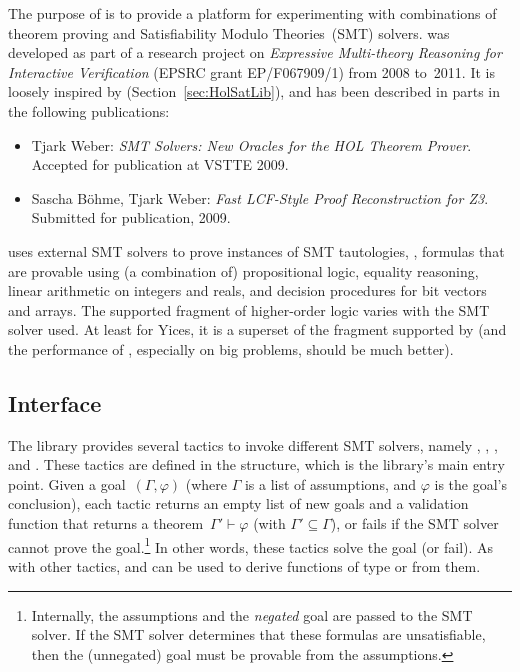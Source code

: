 
\setcounter{sessioncount}{0}

The purpose of  is to provide a platform for
experimenting with combinations of theorem proving and Satisfiability
Modulo Theories~(SMT) solvers.   was developed as part
of a research project on {\it Expressive Multi-theory Reasoning for
  Interactive Verification} (EPSRC grant EP/F067909/1) from 2008
to~2011.  It is loosely inspired by 
(Section~\ref{sec:HolSatLib}), and has been described in parts in the
following publications:
\begin{itemize}
\item Tjark Weber: {\it SMT Solvers: New Oracles for the HOL Theorem
  Prover}.  Accepted for publication at VSTTE 2009.%
\item Sascha B{\"o}hme, Tjark Weber: {\it Fast LCF-Style Proof
  Reconstruction for Z3}. Submitted for publication, 2009.%
\end{itemize}
 uses external SMT solvers to prove instances of SMT
tautologies, \ie, formulas that are provable using (a combination of)
propositional logic, equality reasoning, linear arithmetic on integers
and reals, and decision procedures for bit vectors and arrays.  The
supported fragment of higher-order logic varies with the SMT solver
used.  At least for Yices, it is a superset of the fragment supported
by  (and the performance of ,
especially on big problems, should be much better).

\subsection{Interface}

The library provides several tactics to invoke different SMT solvers,
namely , , , and
.  These tactics are defined in the 
structure, which is the library's main entry point.  Given a
goal~$(\Gamma, \varphi)$ (where $\Gamma$ is a list of assumptions, and
$\varphi$ is the goal's conclusion), each tactic returns an empty list
of new goals and a validation function that returns a theorem~$\Gamma'
\vdash \varphi$ (with $\Gamma' \subseteq \Gamma$), or fails if the SMT
solver cannot prove the goal.\footnote{Internally, the assumptions and
  the \emph{negated} goal are passed to the SMT solver.  If the SMT
  solver determines that these formulas are unsatisfiable, then the
  (unnegated) goal must be provable from the assumptions.}  In other
words, these tactics solve the goal (or fail).  As with other tactics,
 and  can be used to derive
functions of type  or  from them.


